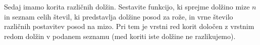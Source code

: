 \documentclass[arhiv]{../izpit}
\begin{document}
  \podnaloga Sedaj imamo korita različnih dolžin. Sestavite funkcijo, ki sprejme dolžino mize $n$ in seznam celih števil, ki predstavlja dolžine posod za rože, in vrne število različnih postavitev posod na mizo. Pri tem je vrstni red korit določen z vrstnim redom dolžin v podanem seznamu (med koriti iste dolžine ne razlikujemo). 
	
\end{document}
